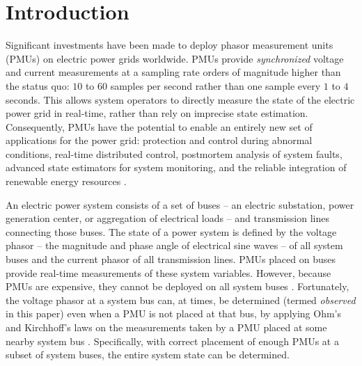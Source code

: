 \section{Introduction}
\label{sec:intro}


Significant investments have been made to deploy phasor measurement units (PMUs) on electric power grids worldwide. PMUs provide \emph{synchronized} voltage and current measurements at a sampling rate orders 
of magnitude higher than the status quo: $10$ to $60$ samples per second rather than one sample every $1$ to $4$ seconds.  This allows system operators to directly measure the state of the electric power grid in real-time, rather than 
rely on imprecise state estimation. Consequently, PMUs have the potential to enable
an entirely new set of applications for the power grid:  protection and control during abnormal conditions, real-time distributed control, postmortem analysis of system faults,
advanced state estimators for system monitoring, and the reliable integration of renewable energy resources \cite{Naspi10}.

An electric power system consists of a set of buses  -- an electric substation, power generation center, or aggregation of electrical loads -- and transmission lines connecting those buses.
The state of a power system is defined by the voltage phasor -- the magnitude and phase angle of electrical sine waves -- of all system buses and the current phasor of all transmission lines.
PMUs placed on buses provide real-time measurements of these system variables. %
However, because PMUs are expensive, they cannot be deployed on all system buses \cite{Baldwin93}\cite{LaRee10}. Fortunately, the voltage phasor at a system bus can, at times, be determined (termed {\it observed} in this paper) even when a PMU is not placed at that bus, by applying Ohm's and Kirchhoff's laws
 on the measurements taken by a PMU placed at some nearby system bus \cite{Baldwin93}\cite{Brueni05}. Specifically, with correct placement of enough PMUs at a subset of system buses, the entire system state can be determined. 


